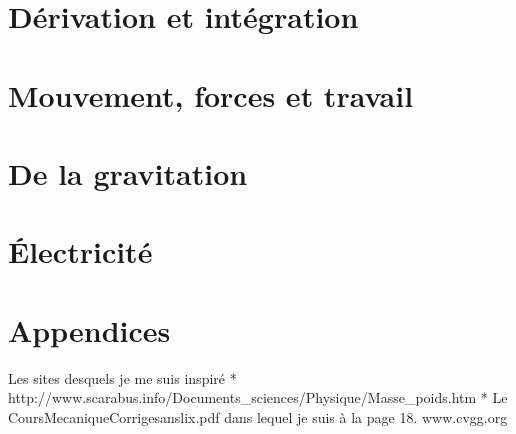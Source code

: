 	
	
	

\chapter{Dérivation et intégration}
	

\chapter{Mouvement, forces et travail}
	
	
	
	
	

\chapter{De la gravitation}
	

\chapter{Électricité}
	


%	

\appendix

\chapter*{Appendices}

\pagestyle{plain}

\setcounter{section}{0}
\renewcommand{\theequation}{\Alph{section}.\arabic{equation}}
\renewcommand{\thenumtho}{\Alph{section}.\arabic{numtho}}
\renewcommand{\thesection}{\Alph{section}}

	
	
\printindex



Les sites desquels je me suis inspiré
  * http://www.scarabus.info/Documents_sciences/Physique/Masse_poids.htm
  * Le CoursMecaniqueCorrigesanslix.pdf dans lequel je suis à la page 18.
     www.cvgg.org

